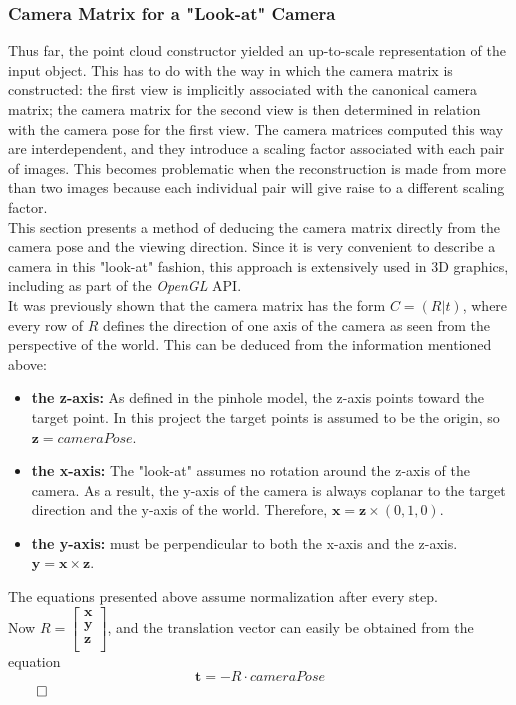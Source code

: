 \documentclass[12pt,a4paper,twoside,openright]{report}
\begin{document}
\subsubsection{Camera Matrix for a "Look-at" Camera}
Thus far, the point cloud constructor yielded an up-to-scale representation of the input object. This has to do with the way in which the camera matrix is constructed: the first view is implicitly associated with the canonical camera matrix; the camera matrix for the second view is then determined in relation with the camera pose for the first view. The camera matrices computed this way are interdependent, and they introduce a scaling factor associated with each pair of images. This becomes problematic when the reconstruction is made from more than two images because each individual pair will give raise to a different scaling factor. \\
This section presents a method of deducing the camera matrix directly from the camera pose and the viewing direction. Since it is very convenient to describe a camera in this "look-at" fashion, this approach is extensively used in 3D graphics, including as part of the \emph{OpenGL} API.\\
\linebreak
It was previously shown that the camera matrix has the form $C = (R | t)$, where every row of $R$ defines the direction of one axis of the camera as seen from the perspective of the world. This can be deduced from the information mentioned above:
\begin{itemize}
\item \textbf{the z-axis:} As defined in the pinhole model, the z-axis points toward the target point. In this project the target points is assumed to be the origin, so $\mathbf{z} = cameraPose$. 
\item \textbf{the x-axis:} The "look-at" assumes no rotation around the z-axis of the camera. As a result, the y-axis of the camera is always coplanar to the target direction and the y-axis of the world. Therefore, $\mathbf{x} = \mathbf{z} \times (0, 1, 0)$.
\item \textbf{the y-axis:} must be perpendicular to both the x-axis and the z-axis. $\mathbf{y} = \mathbf{x} \times \mathbf{z}$.
\end{itemize}
The equations presented above assume normalization after every step.\\
\linebreak
Now $R = \begin{bmatrix}
\mathbf{x} \\
\mathbf{y} \\
\mathbf{z} \\
\end{bmatrix}$, and the translation vector can easily be obtained from the equation
\begin{equation}
\mathbf{t} = -R \cdot cameraPose
\end{equation}
$\qedhere$
\end{document}
